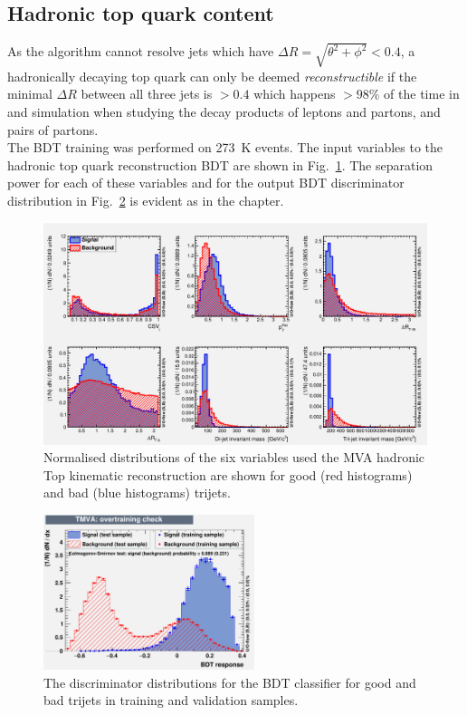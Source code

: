 \subsection{Hadronic top quark content}
\label{sec:topContent13}

As the \antikt algorithm cannot resolve jets which have $\Delta R = \sqrt{  \theta^{2} + \phi^{2} } < 0.4$, a hadronically decaying top quark can only be deemed \emph{reconstructible} if the minimal $\Delta R$ between all three jets is $> 0.4$ which happens $> 98\%$ of the time in \ttbar and \tttt simulation when studying the decay products of leptons and partons, and pairs of partons.\\
The BDT training was performed on 273~K \ttbar events. The input variables to the hadronic top quark reconstruction BDT are shown in Fig.~\ref{fig:TrijetBDTInputFeatures13}. The separation power for each of these variables and for the output BDT discriminator distribution in Fig.~\ref{fig:TrijetBDTOutput13} is evident as in the \runone chapter. 

\begin{figure}[ht!]
\centering
\includegraphics[width=\linewidth]{images/Run2/variables_id_c1.pdf}
\caption{Normalised distributions of the six variables used the MVA hadronic Top kinematic reconstruction are shown for good (red histograms) and bad (blue histograms) trijets.}
\label{fig:TrijetBDTInputFeatures13}
\end{figure}

\begin{figure}[ht!]
\begin{center}
    \includegraphics[width=0.55\textwidth]{images/Run2/overtrain_BDT.pdf}
    \caption{The discriminator distributions for the BDT classifier for good and bad trijets in training and validation samples.}
    \label{fig:TrijetBDTOutput13}
\end{center}
\end{figure}

